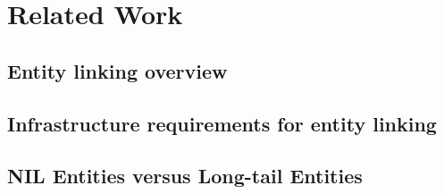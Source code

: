 \section{Related Work}
\subsection{Entity linking overview}





\subsection{Infrastructure requirements for entity linking}
\subsection{NIL Entities versus Long-tail Entities}
